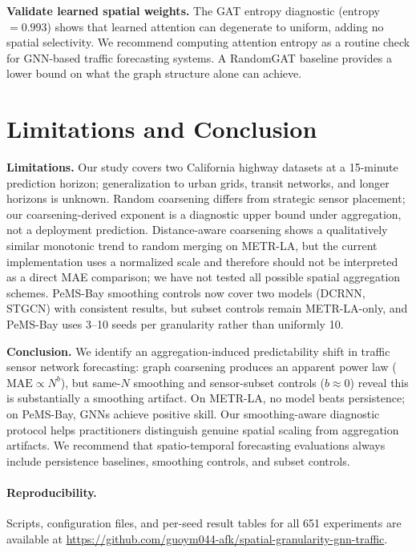 \documentclass[sigconf]{acmart}
\begin{document}
\textbf{Validate learned spatial weights.} The GAT entropy diagnostic (entropy${=}0.993$) shows that learned attention can degenerate to uniform, adding no spatial selectivity. We recommend computing attention entropy as a routine check for GNN-based traffic forecasting systems. A RandomGAT baseline provides a lower bound on what the graph structure alone can achieve.

\section{Limitations and Conclusion}

\textbf{Limitations.} Our study covers two California highway datasets at a 15-minute prediction horizon; generalization to urban grids, transit networks, and longer horizons is unknown. Random coarsening differs from strategic sensor placement; our coarsening-derived exponent is a diagnostic upper bound under aggregation, not a deployment prediction. Distance-aware coarsening shows a qualitatively similar monotonic trend to random merging on METR-LA, but the current implementation uses a normalized scale and therefore should not be interpreted as a direct MAE comparison; we have not tested all possible spatial aggregation schemes. PeMS-Bay smoothing controls now cover two models (DCRNN, STGCN) with consistent results, but subset controls remain METR-LA-only, and PeMS-Bay uses 3--10 seeds per granularity rather than uniformly 10.

\textbf{Conclusion.} We identify an aggregation-induced predictability shift in traffic sensor network forecasting: graph coarsening produces an apparent power law ($\text{MAE} \propto N^b$), but same-$N$ smoothing and sensor-subset controls ($b \approx 0$) reveal this is substantially a smoothing artifact. On METR-LA, no model beats persistence; on PeMS-Bay, GNNs achieve positive skill. Our smoothing-aware diagnostic protocol helps practitioners distinguish genuine spatial scaling from aggregation artifacts. We recommend that spatio-temporal forecasting evaluations always include persistence baselines, smoothing controls, and subset controls.

\paragraph{Reproducibility.}
Scripts, configuration files, and per-seed result tables for all 651 experiments are available at \url{https://github.com/guoym044-afk/spatial-granularity-gnn-traffic}.
\end{document}
